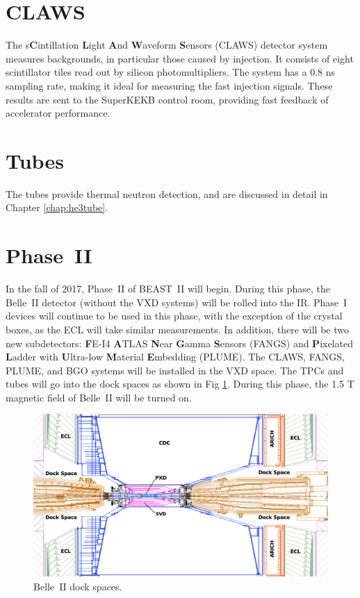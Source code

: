 \section{CLAWS}

	The s\textbf{C}intillation \textbf{L}ight \textbf{A}nd \textbf{W}aveform \textbf{S}ensors (CLAWS) detector system measures backgrounds, in particular those caused by injection. It consists of eight scintillator tiles read out by silicon photomultipliers. The system has a 0.8 ns sampling rate, making it ideal for measuring the fast injection signals. These results are sent to the SuperKEKB control room, providing fast feedback of accelerator performance.


\section{\He Tubes}

	The \he tubes provide thermal neutron detection, and are discussed in detail in Chapter \ref{chap:he3tube}.


\section{Phase~II}

	In the fall of 2017, Phase~II of BEAST~II will begin. During this phase, the Belle~II detector (without the VXD systems) will be rolled into the IR. Phase~I devices will continue to be used in this phase, with the exception of the crystal boxes, as the ECL will take similar measurements. In addition, there will be two new subdetectors: \textbf{F}E-I4 \textbf{A}TLAS \textbf{N}ear \textbf{G}amma \textbf{S}ensors (FANGS) and \textbf{P}ixelated \textbf{L}adder with \textbf{U}ltra-low \textbf{M}aterial \textbf{E}mbedding (PLUME). The CLAWS, FANGS, PLUME, and BGO systems will be installed in the VXD space. The TPCs and \he tubes will go into the dock spaces as shown in Fig \ref{fig:dockSpace}. During this phase, the 1.5 T magnetic field of Belle~II will be turned on.

\begin{figure}[htb]
	\centerfloat
		\includegraphics[width=\textwidth]{images/Belle-ll-DockSpace_text}
	\caption[Belle~II dock spaces]{Belle~II dock spaces.}		
	\label{fig:dockSpace}
\end{figure}



















